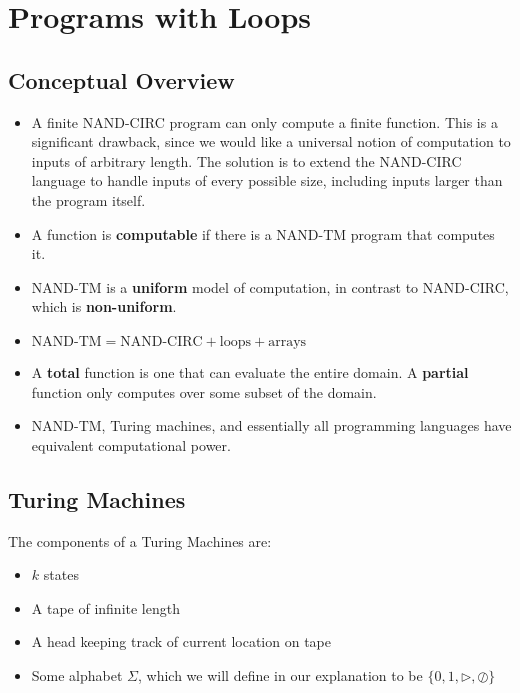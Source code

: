 \documentclass[11pt]{article}
\theoremstyle{definition}
\theoremstyle{remark}
\begin{document}
\vspace{4cm}

\newpage
\section{Programs with Loops}

\subsection{Conceptual Overview}

\begin{itemize}
   
\item A finite NAND-CIRC program can only compute a finite function. This is a significant drawback, since we would like a universal notion of computation to inputs of arbitrary length. The solution is to extend the NAND-CIRC language to handle inputs of every possible size, including inputs larger than the program itself. 
\item A function is \textbf{computable} if there is a NAND-TM program that computes it.
\item NAND-TM is a \textbf{uniform} model of computation, in contrast to NAND-CIRC, which is \textbf{non-uniform}. 
\item $ \text{NAND-TM} = \text{NAND-CIRC} + \text{loops} + \text{arrays}$
\item A \textbf{total} function is one that can evaluate the entire domain. A \textbf{partial} function only computes over some subset of the domain.
\item NAND-TM, Turing machines, and essentially all programming languages have equivalent computational power.
\end{itemize}

\subsection{Turing Machines}
The components of a Turing Machines are: 
\begin{itemize}
	\item $k$ states
	\item A tape of infinite length
	\item A head keeping track of current location on tape
	\item Some alphabet $\Sigma$, which we will define in our explanation to be $\{0, 1, \triangleright, \oslash\}$
\end{itemize}
\end{document}
